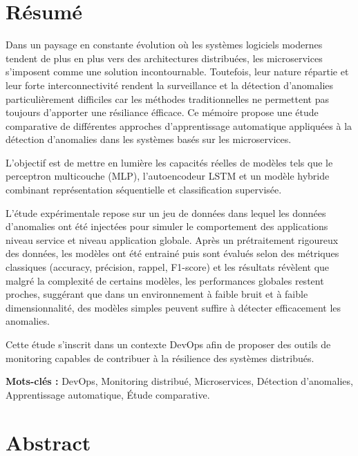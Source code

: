 \documentclass[a4paper,12pt]{report}
\begin{document}
\cleardoublepage
{}
\chapter*{Résumé}

Dans un paysage en constante évolution où les systèmes logiciels modernes tendent de plus en plus vers des architectures distribuées, les microservices s’imposent comme une solution incontournable. Toutefois, leur nature répartie et leur forte interconnectivité rendent la surveillance et la détection d’anomalies particulièrement difficiles car les méthodes traditionnelles ne permettent pas toujours d’apporter une résiliance éfficace. Ce mémoire propose une étude comparative de différentes approches d’apprentissage automatique appliquées à la détection d’anomalies dans les systèmes basés sur les microservices.

L’objectif est de mettre en lumière les capacités réelles de modèles tels que le perceptron multicouche (MLP), l’autoencodeur LSTM et un modèle hybride combinant représentation séquentielle et classification supervisée.

L’étude expérimentale repose sur un jeu de données dans lequel les données d’anomalies ont été injectées pour simuler le comportement des applications niveau service et niveau application globale. Après un prétraitement rigoureux des données, les modèles ont été entrainé puis sont évalués selon des métriques classiques (accuracy, précision, rappel, F1-score) et les résultats révèlent que malgré la complexité de certains modèles, les performances globales restent proches, suggérant que dans un environnement à faible bruit et à faible dimensionnalité, des modèles simples peuvent suffire à détecter efficacement les anomalies.

Cette étude s’inscrit dans un contexte DevOps afin de proposer des outils de monitoring capables de contribuer à la résilience des systèmes distribués.


\vspace{0.5cm}
\noindent\textbf{Mots-clés :} DevOps, Monitoring distribué, Microservices, Détection d'anomalies, Apprentissage automatique, Étude comparative.


\cleardoublepage
{}
\chapter*{Abstract}
\end{document}
